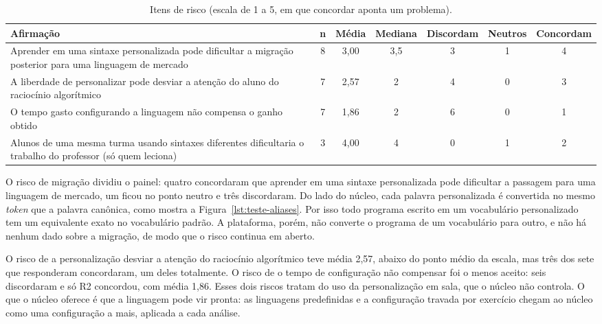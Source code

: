 \begin{table}[htbp]
\centering
\caption{Itens de risco (escala de 1 a 5, em que concordar aponta um problema).}
\label{tab:resultado-riscos}
\footnotesize
\renewcommand{\arraystretch}{1.2}
\begin{tabular}{|p{5.8cm}|c|c|c|c|c|c|}
\hline
\textbf{Afirmação} & \textbf{n} & \textbf{Média} & \textbf{Mediana} & \textbf{Discordam} & \textbf{Neutros} & \textbf{Concordam} \\\hline
Aprender em uma sintaxe personalizada pode dificultar a migração posterior para uma linguagem de mercado & 8 & 3,00 & 3,5 & 3 & 1 & 4 \\\hline
A liberdade de personalizar pode desviar a atenção do aluno do raciocínio algorítmico & 7 & 2,57 & 2 & 4 & 0 & 3 \\\hline
O tempo gasto configurando a linguagem não compensa o ganho obtido & 7 & 1,86 & 2 & 6 & 0 & 1 \\\hline
Alunos de uma mesma turma usando sintaxes diferentes dificultaria o trabalho do professor (só quem leciona) & 3 & 4,00 & 4 & 0 & 1 & 2 \\\hline
\end{tabular}
\end{table}

O risco de migração dividiu o painel: quatro concordaram que aprender em uma sintaxe personalizada pode dificultar a passagem para uma linguagem de mercado, um ficou no ponto neutro e três discordaram. Do lado do núcleo, cada palavra personalizada é convertida no mesmo \textit{token} que a palavra canônica, como mostra a Figura~\ref{lst:teste-aliases}. Por isso todo programa escrito em um vocabulário personalizado tem um equivalente exato no vocabulário padrão. A plataforma, porém, não converte o programa de um vocabulário para outro, e não há nenhum dado sobre a migração, de modo que o risco continua em aberto.

O risco de a personalização desviar a atenção do raciocínio algorítmico teve média 2,57, abaixo do ponto médio da escala, mas três dos sete que responderam concordaram, um deles totalmente. O risco de o tempo de configuração não compensar foi o menos aceito: seis discordaram e só R2 concordou, com média 1,86. Esses dois riscos tratam do uso da personalização em sala, que o núcleo não controla. O que o núcleo oferece é que a linguagem pode vir pronta: as linguagens predefinidas e a configuração travada por exercício chegam ao núcleo como uma configuração a mais, aplicada a cada análise.

